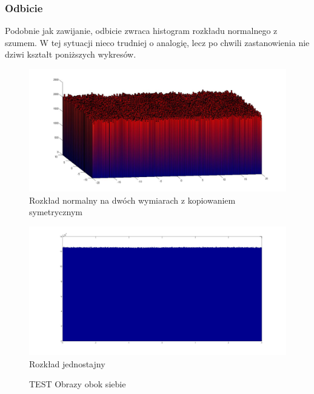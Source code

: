 \documentclass{mini}
\begin{document}
\subsubsection*{Odbicie}
Podobnie jak zawijanie, odbicie zwraca histogram rozkładu normalnego z szumem. W tej sytuacji nieco trudniej o analogię, lecz po chwili zastanowienia nie dziwi kształt poniższych wykresów.
\begin{figure}[H]
\centering
\includegraphics[width=\textwidth]{rf_n_10M_2__20_20__10_10_4_2}
\caption{Rozkład normalny na dwóch wymiarach z kopiowaniem symetrycznym}
\end{figure}

\begin{figure}[H]
\centering
\includegraphics[width=\textwidth]{rf_j_100M_1__3_3}
\caption{Rozkład jednostajny}
\end{figure}

\begin{figure}[H]
\centering
{}
\quad
{}
\caption{TEST Obrazy obok siebie}
\end{figure}
\end{document}
